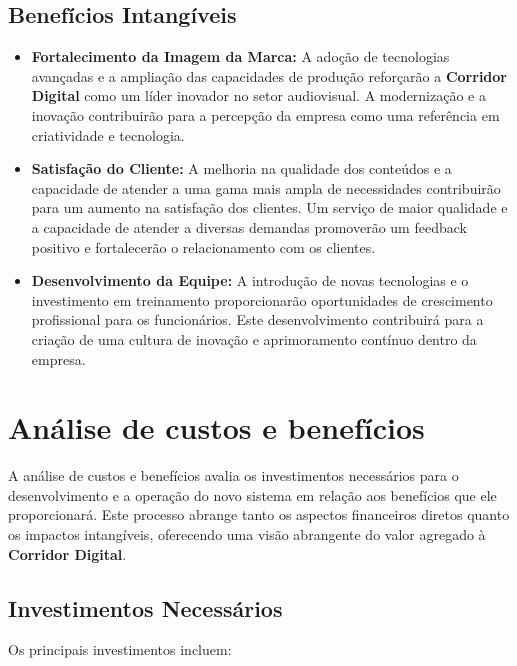 \subsection{Benefícios Intangíveis}

\begin{itemize}
    \item \textbf{Fortalecimento da Imagem da Marca:} A adoção de tecnologias avançadas e a ampliação das capacidades de produção reforçarão a \textbf{Corridor Digital} como um líder inovador no setor audiovisual. A modernização e a inovação contribuirão para a percepção da empresa como uma referência em criatividade e tecnologia.
    
    \item \textbf{Satisfação do Cliente:} A melhoria na qualidade dos conteúdos e a capacidade de atender a uma gama mais ampla de necessidades contribuirão para um aumento na satisfação dos clientes. Um serviço de maior qualidade e a capacidade de atender a diversas demandas promoverão um feedback positivo e fortalecerão o relacionamento com os clientes.
    
    \item \textbf{Desenvolvimento da Equipe:} A introdução de novas tecnologias e o investimento em treinamento proporcionarão oportunidades de crescimento profissional para os funcionários. Este desenvolvimento contribuirá para a criação de uma cultura de inovação e aprimoramento contínuo dentro da empresa.
\end{itemize}


\section{Análise de custos e benefícios}

A análise de custos e benefícios avalia os investimentos necessários para o desenvolvimento e a operação do novo sistema em relação aos benefícios que ele proporcionará. Este processo abrange tanto os aspectos financeiros diretos quanto os impactos intangíveis, oferecendo uma visão abrangente do valor agregado à \textbf{Corridor Digital}.

\subsection{Investimentos Necessários}

Os principais investimentos incluem:

